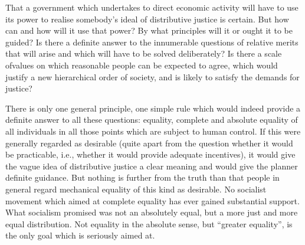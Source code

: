 \documentclass[11pt,openany]{book}
\begin{document}
\begin{center}\textasteriskcentered\hspace{0.9em}\textasteriskcentered\hspace{0.9em}\textasteriskcentered\end{center}

\begin{center}\textasteriskcentered\hspace{0.9em}\textasteriskcentered\hspace{0.9em}\textasteriskcentered\end{center}

\begin{center}\textasteriskcentered\hspace{0.9em}\textasteriskcentered\hspace{0.9em}\textasteriskcentered\end{center}

\begin{center}\textasteriskcentered\hspace{0.9em}\textasteriskcentered\hspace{0.9em}\textasteriskcentered\end{center}

\begin{center}\textasteriskcentered\hspace{0.9em}\textasteriskcentered\hspace{0.9em}\textasteriskcentered\end{center}

That a government which undertakes to direct economic activity will have to use its power to realise somebody's ideal of distributive justice is certain. But how can and how will it use that power? By what principles will it or ought it to be guided? Is there a definite answer to the innumerable questions of relative merits that will arise and which will have to be solved deliberately? Is there a scale ofvalues on which reasonable people can be expected to agree, which would justify a new hierarchical order of society, and is likely to satisfy the demands for justice?

There is only one general principle, one simple rule which would indeed provide a definite answer to all these questions: equality, complete and absolute equality of all individuals in all those points which are subject to human control. If this were generally regarded as desirable (quite apart from the question whether it would be practicable, i.e., whether it would provide adequate incentives), it would give the vague idea of distributive justice a clear meaning and would give the planner definite guidance. But nothing is further from the truth than that people in general regard mechanical equality of this kind as desirable. No socialist movement which aimed at complete equality has ever gained substantial support. What socialism promised was not an absolutely equal, but a more just and more equal distribution. Not equality in the absolute sense, but ``greater equality'', is the only goal which is seriously aimed at.
\end{document}
